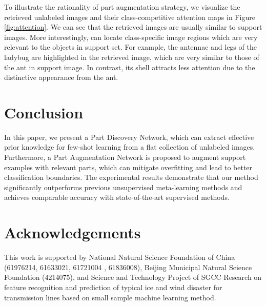 \documentclass{article}
\begin{document}
To illustrate the rationality  of part augmentation strategy, we visualize the retrieved unlabeled images and their class-competitive attention maps in Figure \ref{fig:attention}. We can see that the retrieved images are usually similar to support images. More interestingly,  can locate class-specific image regions which are very relevant to the objects in support set. For example, the antennae and legs of the ladybug are highlighted in the retrieved image, which are very similar to those of the ant in support image. In contrast, its shell attracts less attention due to the distinctive appearance from the ant.


\section{Conclusion}
In this paper, we present a Part Discovery Network, which can extract effective prior knowledge for few-shot learning from a flat collection of unlabeled images. Furthermore, a Part Augmentation Network is proposed to augment support examples with relevant parts, which can mitigate overfitting and lead to better classification boundaries. The experimental results demonstrate that our method significantly outperforms previous unsupervised meta-learning methods and achieves comparable accuracy with state-of-the-art supervised methods.

\section*{Acknowledgements}
This work is supported by National Natural Science Foundation of China (61976214, 61633021, 61721004
, 61836008), Beijing Municipal Natural Science Foundation (4214075), and Science and Technology Project of SGCC Research on feature recognition and prediction of typical ice and wind disaster for transmission lines based on small sample machine learning method.






\end{document}
